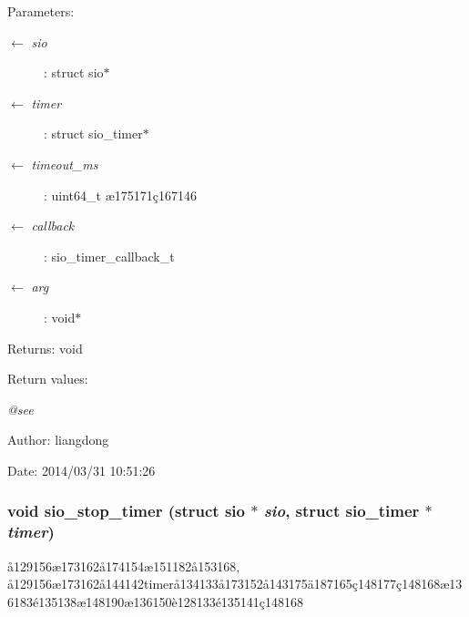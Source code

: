 \begin{Desc}
\item[Parameters:]
\begin{description}
\item[\mbox{$\leftarrow$} {\em sio}]: struct sio$\ast$ \item[\mbox{$\leftarrow$} {\em timer}]: struct sio\_\-timer$\ast$ \item[\mbox{$\leftarrow$} {\em timeout\_\-ms}]: uint64\_\-t \ae{}175171\c{c}167146 \item[\mbox{$\leftarrow$} {\em callback}]: sio\_\-timer\_\-callback\_\-t \item[\mbox{$\leftarrow$} {\em arg}]: void$\ast$ \end{description}
\end{Desc}
\begin{Desc}
\item[Returns:]void \end{Desc}
\begin{Desc}
\item[Return values:]
\begin{description}
\item[{\em @see}]\end{description}
\end{Desc}
\begin{Desc}
\item[Author:]liangdong \end{Desc}
\begin{Desc}
\item[Date:]2014/03/31 10:51:26 \end{Desc}
\subsubsection{\setlength{\rightskip}{0pt plus 5cm}void sio\_\-stop\_\-timer (struct sio $\ast$ {\em sio}, struct sio\_\-timer $\ast$ {\em timer})}\label{sio_8h_a16}


\aa{}129156\ae{}173162\aa{}174154\ae{}151182\aa{}153168, \aa{}129156\ae{}173162\aa{}144142timer\aa{}134133\aa{}173152\aa{}143175\"{a}187165\c{c}148177\c{c}148168\ae{}136183\'{e}135138\ae{}148190\ae{}136150\`{e}128133\'{e}135141\c{c}148168 

